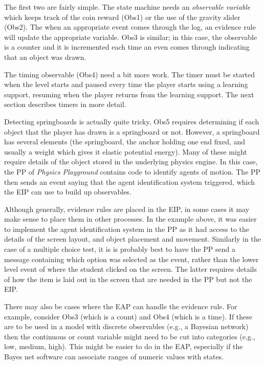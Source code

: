 \documentclass{article}
\begin{document}
  The first two are fairly simple.  The state machine needs an
  \textit{observable variable} which keeps track of the coin reward
  (Obs1) or the use of the gravity slider (Obs2).  The when an
  appropriate event comes through the log, an evidence rule will
  update the appropriate variable.  Obs3 is similar; in this case, the
  observable is a counter and it is incremented each time an even
  comes through indicating that an object was drawn.

  The timing observable (Obs4) need a bit more work.  The timer must
  be started when the level starts and paused every time the player
  starts using a learning support, resuming when the player returns
  from the learning support.  The next section describes timers in
  more detail.
  
  Detecting springboards is actually quite tricky.  Obs5 requires
  determining if each object that the player has drawn is a
  springboard or not.  However, a springboard has several elements
  (the springboard, the anchor holding one end fixed, and usually a
  weight which gives it elastic potential energy).  Many of these
  might require details of the object stored in the underlying physics
  engine.  In this case, the PP of \textit{Physics Playground}
  contains code to identify agents of motion.  The PP then sends an
  event saying that the agent identification system triggered, which
  the EIP can use to build up observables.

  Although generally, evidence rules are placed in the EIP, in some
  cases it may make sense to place them in other processes.  In the
  example above, it was easier to implement the agent identification
  system in the PP as it had access to the details of the screen
  layout, and object placement and movement.  Similarly in the case
  of a multiple choice test, it is is probably best to have the PP
  send a message containing which option was selected as the event,
  rather than the lower level event of where the student clicked on
  the screen.  The latter requires details of how the item is laid
  out in the screen that are needed in the PP but not the EIP.

  There may also be cases where the EAP can handle the evidence rule.
  For example, consider Obs3 (which is a count) and Obs4 (which is a
  time).  If these are to be used in a model with discrete observables
  (e.g., a Bayesian network) then the continuous or count variable
  might need to be cut into categories (e.g., low, medium, high).
  This might be easier to do in the EAP, especially if the Bayes net
  software can associate ranges of numeric values with states.
  
\end{document}
